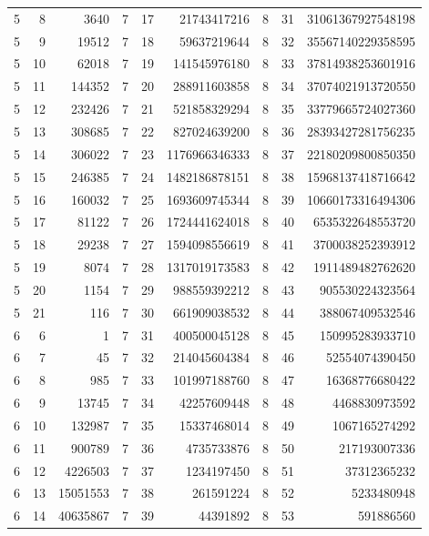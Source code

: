\documentclass[reqno]{amsart}
\numberwithin{equation}{section}
\begin{document}
\begin{table}[htbp]
{\begin{tabular}{@{}rrr@{\hspace{5em}}rrr@{\hspace{5em}}rrr@{}}
        5&  8& 3640 & 7& 17 & 21743417216& 8& 31 & 31061367927548198  \\
        5& 9& 19512 & 7&  18 & 59637219644 & 8& 32 & 35567140229358595  \\
        5& 10& 62018 & 7& 19 & 141545976180& 8& 33 & 37814938253601916  \\
        5& 11& 144352 & 7& 20 & 288911603858& 8& 34 & 37074021913720550   \\
        5& 12& 232426 & 7& 21 & 521858329294 & 8& 35 & 33779665724027360  \\
        5& 13& 308685 & 7& 22 & 827024639200 & 8& 36 & 28393427281756235  \\
        5& 14& 306022  & 7& 23 & 1176966346333 & 8& 37 & 22180209800850350  \\
        5& 15& 246385  & 7& 24 & 1482186878151 & 8& 38 & 15968137418716642  \\
        5& 16& 160032  & 7& 25 & 1693609745344 & 8& 39 & 10660173316494306  \\
        5& 17& 81122  & 7& 26 & 1724441624018 & 8& 40 & 6535322648553720  \\
        5& 18& 29238 & 7& 27 &1594098556619 & 8& 41 & 3700038252393912  \\
        5& 19& 8074 & 7& 28 & 1317019173583 & 8& 42 & 1911489482762620  \\
        5& 20& 1154 & 7& 29 & 988559392212 & 8& 43 & 905530224323564  \\
        5& 21& 116 & 7& 30 & 661909038532 & 8& 44 & 388067409532546  \\
        6& 6& 1 & 7 & 31 & 400500045128 & 8& 45 & 150995283933710  \\
        6& 7& 45 & 7& 32 & 214045604384 & 8& 46 & 52554074390450  \\
        6& 8& 985 & 7& 33 & 101997188760 & 8& 47 & 16368776680422  \\
        6& 9 & 13745 &7& 34 & 42257609448 & 8& 48 & 4468830973592 \\
        6& 10 & 132987 & 7& 35 & 15337468014 & 8& 49 & 1067165274292 \\
        6& 11& 900789 & 7& 36 & 4735733876 & 8& 50 & 217193007336 \\
        6& 12& 4226503 & 7& 37 & 1234197450 & 8& 51 & 37312365232  \\
        6& 13& 15051553 & 7& 38 & 261591224 & 8& 52 & 5233480948 \\
        6& 14& 40635867 & 7& 39 & 44391892 & 8& 53 & 591886560 \\

\end{tabular}}
\end{table}
\end{document}

